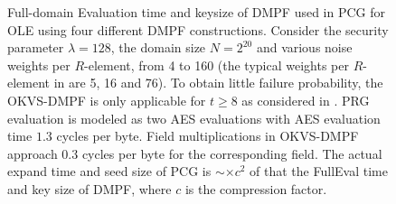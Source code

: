 \begin{figure}[H]
	\centering
	\caption{Full-domain Evaluation time and keysize of DMPF used in PCG for OLE\cite{cryptoeprint:2022/1035} using four different DMPF constructions. Consider the security parameter $\lambda=128$, the domain size $N = 2^{20}$ and various noise weights per $R$-element, from 4 to 160 (the typical weights per $R$-element in \cite{cryptoeprint:2022/1035} are 5, 16 and 76). To obtain little failure probability, the OKVS-DMPF is only applicable for $t\ge 8$ as considered in \cite{cryptoeprint:2022/320}. PRG evaluation is modeled as two AES evaluations with AES evaluation time $1.3$ cycles per byte. Field multiplications in OKVS-DMPF approach $0.3$ cycles per byte \cite{cryptoeprint:2017/168} for the corresponding field. The actual expand time and seed size of PCG is $\sim \times c^2$ of that the FullEval time and key size of DMPF, where $c$ is the compression factor. }
	\label{fig:detailed_PCG}
\end{figure}

